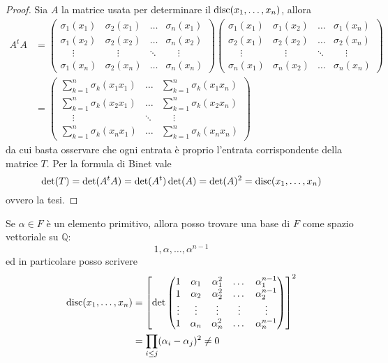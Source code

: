 \begin{proof}
	Sia $A$ la matrice usata per determinare il $\operatorname{disc}(x_1,\dots,x_n)$, allora 
	\begin{align*}
		A^t A & = \left(
		\begin{array}{llll}
			\sigma_1(x_1) & \sigma_2(x_1) & \dots & \sigma_n(x_1) \\
			\sigma_1(x_2) & \sigma_2(x_2)  & \dots & \sigma_n(x_2) \\
			\quad\ \vdots & \quad\ \vdots & \ddots & \quad\ \vdots \\
			\sigma_1(x_n) & \sigma_2(x_n) & \dots & \sigma_n(x_n)
		\end{array}
		\right)\left(
		\begin{array}{llll}
			\sigma_1(x_1) & \sigma_1(x_2) & \dots & \sigma_1(x_n) \\
			\sigma_2(x_1) & \sigma_2(x_2)  & \dots & \sigma_2(x_n) \\
			\quad\ \vdots & \quad\ \vdots & \ddots & \quad\ \vdots \\
			\sigma_n(x_1) & \sigma_n(x_2) & \dots & \sigma_n(x_n)
		\end{array}
		\right)\\
		& = 
		\left(
		\begin{array}{lll}
			\sum_{k=1}^n\sigma_k(x_1x_1) & \dots & \sum_{k=1}^n \sigma_k(x_1x_n) \\
			\sum_{k=1}^n\sigma_k(x_2x_1) & \dots & \sum_{k=1}^n\sigma_k(x_2x_n)  \\
			\quad\ \vdots & \ddots & \quad\ \vdots \\
			\sum_{k=1}^n\sigma_k(x_nx_1) & \dots & \sum_{k=1}^n\sigma_k(x_nx_n) 
		\end{array}
		\right)
	\end{align*}
	da cui basta osservare che ogni entrata è proprio l'entrata corrispondente della
	matrice $T$. Per la formula di Binet vale
	\begin{equation*}
		\det(T) = \det(A^tA) = \det(A^t)\det(A) = \det(A)^2 = \operatorname{disc}(x_1,\dots,x_n) 
	\end{equation*}
 	ovvero la tesi.
\end{proof}
\begin{osservazione}
	Se $\alpha\in F$ è un elemento primitivo, allora posso trovare una base di $F$ come spazio vettoriale su $\mathbb{Q}$:
	\begin{equation*}
	1,\alpha,\dots,\alpha^{n-1}
	\end{equation*}
	ed in particolare posso scrivere
	\begin{align*}
	\operatorname{disc}(x_1,\dots,x_n)
	&=\left[\det
	\begin{pmatrix}
	1 & \alpha_1 & \alpha_1^2 & \dots & \alpha_1^{n-1}\\
	1 & \alpha_2 & \alpha_2^2 & \dots & \alpha_2^{n-1}\\
	\vdots&\vdots&\vdots&\vdots&\vdots\\
	1 & \alpha_n & \alpha_n^2 & \dots & \alpha_n^{n-1}
	\end{pmatrix}
	\right]^2\\
	&=\prod_{i\leq j}(\alpha_i-\alpha_j)^2\neq0
	\end{align*}
\end{osservazione}
